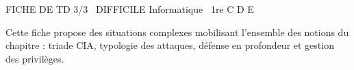 \documentclass[11pt]{article}
\begin{document}
\begin{tcolorbox}[enhanced,colback=popink,colframe=popink,arc=10pt,boxrule=0pt,left=12pt,right=12pt,top=9pt,bottom=9pt]
{\color{white}\popxbold\small FICHE DE TD 3/3 \textbullet\ DIFFICILE \hfill Informatique \textbullet\ 1re C D E\par}
\end{tcolorbox}
\vspace{4pt}
Cette fiche propose des situations complexes mobilisant l'ensemble des notions du chapitre : triade CIA, typologie des attaques, défense en profondeur et gestion des privilèges.
\end{document}

